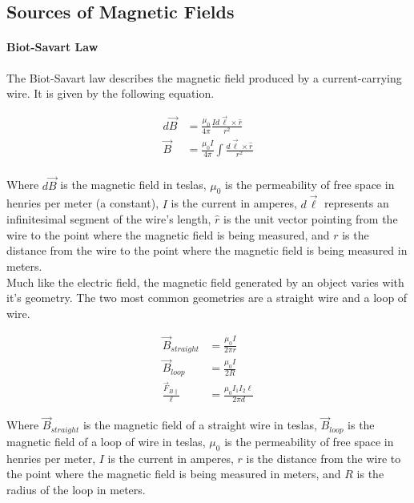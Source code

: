 \subsection{Sources of Magnetic Fields}
\hrulefill

\paragraph*{Biot-Savart Law}
The Biot-Savart law describes the magnetic field produced by a current-carrying wire. It is given by the following equation.

\begin{align*}
    d\vec{B} &= \frac{\mu_0}{4\pi}\frac{Id\vec{\ell} \times \hat{r}}{r^2}\\
    \vec{B} &= \frac{\mu_0 I}{4\pi}\int \frac{d\vec{\ell} \times \hat{r}}{r^2}\\
\end{align*}

Where $d\vec{B}$ is the magnetic field in teslas, $\mu_0$ is the permeability of free space in henries per meter (a constant), 
$I$ is the current in amperes, $d\vec{\ell}$ represents an infinitesimal segment of the wire's length, $\hat{r}$ is the unit vector 
pointing from the wire to the point where the magnetic field is being measured, and $r$ is the distance from the wire to the point where 
the magnetic field is being measured in meters.\\

Much like the electric field, the magnetic field generated by an object varies with it's geometry. The two most common geometries are a straight 
wire and a loop of wire.

\begin{align*}
    \vec{B}_{straight} &= \frac{\mu_0 I}{2\pi r}\\
    \vec{B}_{loop} &= \frac{\mu_0 I}{2R}\\
    \frac{\vec{F}_{B\parallel}}{\ell} &= \frac{\mu_0 I_1 I_2 \ell}{2\pi d}
\end{align*}

Where $\vec{B}_{straight}$ is the magnetic field of a straight wire in teslas, $\vec{B}_{loop}$ is the magnetic field of a loop of wire in teslas,
$\mu_0$ is the permeability of free space in henries per meter, $I$ is the current in amperes, $r$ is the distance from the wire to the point where
the magnetic field is being measured in meters, and $R$ is the radius of the loop in meters.\\


